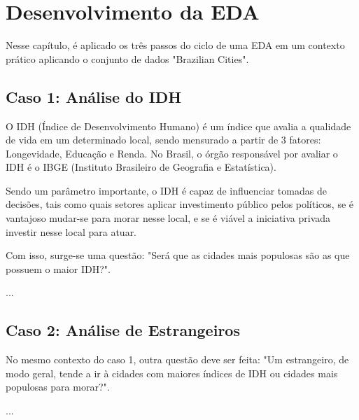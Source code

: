 \chapter{Desenvolvimento da EDA}

Nesse capítulo, é aplicado os três passos do ciclo de uma EDA em um contexto prático aplicando o conjunto de dados "Brazilian Cities".

\section{Caso 1: Análise do IDH}

O IDH (Índice de Desenvolvimento Humano) é um índice que avalia a qualidade de vida em um determinado local, sendo mensurado a partir de 3 fatores: Longevidade, Educação e Renda. No Brasil, o órgão responsável por avaliar o IDH é o IBGE (Instituto Brasileiro de Geografia e Estatística).

Sendo um parâmetro importante, o IDH é capaz de influenciar tomadas de decisões, tais como quais setores aplicar investimento público pelos políticos, se é vantajoso mudar-se para morar nesse local, e se é viável a iniciativa privada investir nesse local para atuar.

Com isso, surge-se uma questão: "Será que as cidades mais populosas são as que possuem o maior IDH?".

...

\section{Caso 2: Análise de Estrangeiros}

No mesmo contexto do caso 1, outra questão deve ser feita: "Um estrangeiro, de modo geral, tende a ir à cidades com maiores índices de IDH ou cidades mais populosas para morar?".

...




